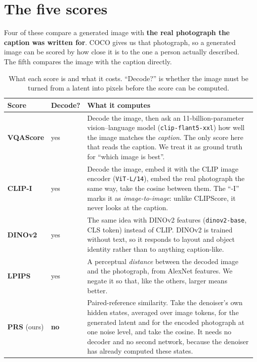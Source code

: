 \documentclass[11pt]{article}
\begin{document}
\section{The five scores}
\label{sec:scores}

Four of these compare a generated image with \textbf{the real photograph the caption was written
for}. COCO gives us that photograph, so a generated image can be scored by how close it is to the
one a person actually described. The fifth compares the image with the caption directly.

\begin{table}[h]
\centering
\caption{What each score is and what it costs. ``Decode?'' is whether the image must be turned from
a latent into pixels before the score can be computed.}
\label{tab:scoredefs}
\small
\begin{tabularx}{\textwidth}{@{}llX@{}}
\toprule
Score & Decode? & What it computes \\
\midrule
\textbf{VQAScore} & yes & Decode the image, then ask an 11-billion-parameter vision--language model
  (\texttt{clip-flant5-xxl}) how well the image matches the \emph{caption}. The only score here that
  reads the caption. We treat it as ground truth for ``which image is best''. \\
\textbf{CLIP-I} & yes & Decode the image, embed it with the CLIP image encoder
  (\texttt{ViT-L/14}), embed the real photograph the same way, take the cosine between them. The
  ``-I'' marks it as \emph{image-to-image}: unlike CLIPScore, it never looks at the caption. \\
\textbf{DINOv2} & yes & The same idea with DINOv2 features (\texttt{dinov2-base}, CLS token) instead
  of CLIP. DINOv2 is trained without text, so it responds to layout and object identity rather than
  to anything caption-like. \\
\textbf{LPIPS} & yes & A perceptual \emph{distance} between the decoded image and the photograph,
  from AlexNet features. We negate it so that, like the others, larger means better. \\
\textbf{PRS} (ours) & \textbf{no} & Paired-reference similarity. Take the denoiser's own hidden
  states, averaged over image tokens, for the generated latent and for the encoded photograph at one
  noise level, and take the cosine. It needs no decoder and no second network, because the denoiser
  has already computed these states. \\
\bottomrule
\end{tabularx}
\end{table}
\end{document}

